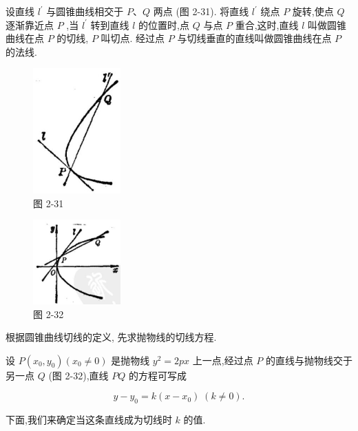 \documentclass[lang=cn,newtx,10pt,scheme=chinese]{elegantbook}
\begin{document}
\begin{definition}[切线和法线] 
设直线 \({l}^{\prime }\) 与圆锥曲线相交于 \(P\text{、}Q\) 两点 (图 2-31). 将直线 \({l}^{\prime }\) 绕点 \(P\) 旋转,使点 \(Q\) 逐渐靠近点 \(P\) ,当 \({l}^{\prime }\) 转到直线 \(l\) 的位置时,点 \(Q\) 与点 \(P\) 重合,这时,直线 \(l\) 叫做圆锥曲线在点 \(P\) 的切线, \(P\) 叫切点. 经过点 \(P\) 与切线垂直的直线叫做圆锥曲线在点 \(P\) 的法线.
\end{definition}
\begin{figure}[h]
  \centering
  \includegraphics[max width=0.3\textwidth]{images/01912cc2-ffb6-728e-9ae7-b113ff05c64b_117_209153.jpg}
  \caption{图 2-31}
\end{figure}



\begin{figure}[h]
  \centering
  \includegraphics[max width=0.3\textwidth]{images/01912cc2-ffb6-728e-9ae7-b113ff05c64b_117_627681.jpg}
  \caption{图 2-32}
\end{figure}



根据圆锥曲线切线的定义, 先求抛物线的切线方程.

设 \(P\left( {{x}_{0},{y}_{0}}\right) \left( {{x}_{0} \neq 0}\right)\) 是抛物线 \({y}^{2} = {2px}\) 上一点,经过点 \(P\) 的直线与抛物线交于另一点 \(Q\) (图 2-32),直线 \({PQ}\) 的方程可写成

\[
  y - {y}_{0} = k\left( {x - {x}_{0}}\right) \;\left( {k \neq 0}\right) .
\]

下面,我们来确定当这条直线成为切线时 \(k\) 的值.
\end{document}
